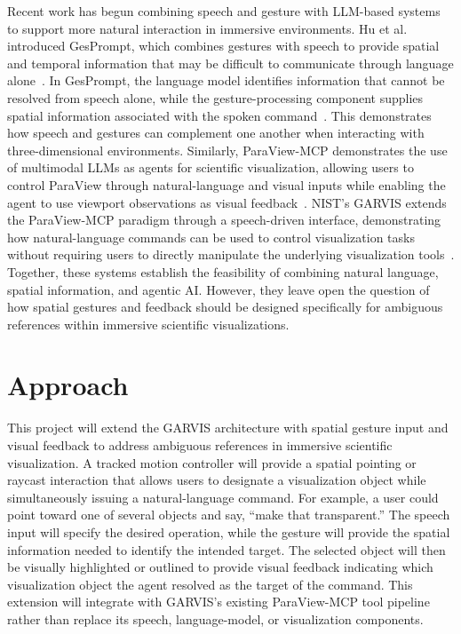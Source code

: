 \documentclass[sigconf,nonacm]{acmart}
\begin{document}
Recent work has begun combining speech and gesture with LLM-based systems to support more natural interaction in immersive environments. Hu et al. introduced GesPrompt, which combines gestures with speech to provide spatial and temporal information that may be difficult to communicate through language alone~\cite{hu2025gesprompt}. In GesPrompt, the language model identifies information that cannot be resolved from speech alone, while the gesture-processing component supplies spatial information associated with the spoken command~\cite{hu2025gesprompt}. This demonstrates how speech and gestures can complement one another when interacting with three-dimensional environments. Similarly, ParaView-MCP demonstrates the use of multimodal LLMs as agents for scientific visualization, allowing users to control ParaView through natural-language and visual inputs while enabling the agent to use viewport observations as visual feedback~\cite{liu2025paraview}. NIST’s GARVIS extends the ParaView-MCP paradigm through a speech-driven interface, demonstrating how natural-language commands can be used to control visualization tasks without requiring users to directly manipulate the underlying visualization tools~\cite{su2025garvis}. Together, these systems establish the feasibility of combining natural language, spatial information, and agentic AI. However, they leave open the question of how spatial gestures and feedback should be designed specifically for ambiguous references within immersive scientific visualizations.


\section{Approach}
\label{sec:approach}

This project will extend the GARVIS architecture with spatial gesture input and visual feedback to address ambiguous references in immersive scientific visualization. A tracked motion controller will provide a spatial pointing or raycast interaction that allows users to designate a visualization object while simultaneously issuing a natural-language command. For example, a user could point toward one of several objects and say, “make that transparent.” The speech input will specify the desired operation, while the gesture will provide the spatial information needed to identify the intended target. The selected object will then be visually highlighted or outlined to provide visual feedback indicating which visualization object the agent resolved as the target of the command. This extension will integrate with GARVIS’s existing ParaView-MCP tool pipeline rather than replace its speech, language-model, or visualization components.
\end{document}
